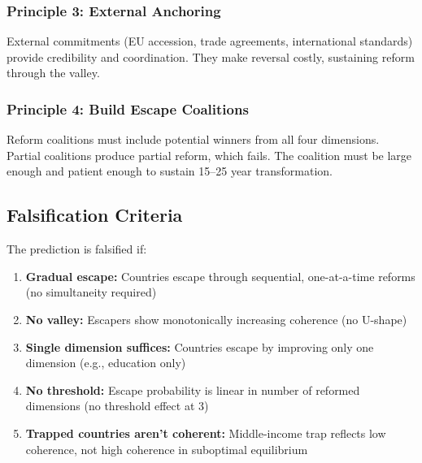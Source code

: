 \subsubsection{Principle 3: External Anchoring}

\begin{tcolorbox}[colback=yellow!5!white, colframe=yellow!75!black]
External commitments (EU accession, trade agreements, international standards) 
provide credibility and coordination. They make reversal costly, sustaining 
reform through the valley.
\end{tcolorbox}

\subsubsection{Principle 4: Build Escape Coalitions}

\begin{tcolorbox}[colback=yellow!5!white, colframe=yellow!75!black]
Reform coalitions must include potential winners from all four dimensions. 
Partial coalitions produce partial reform, which fails. The coalition must 
be large enough and patient enough to sustain 15--25 year transformation.
\end{tcolorbox}

\subsection{Falsification Criteria}

The prediction is falsified if:

\begin{enumerate}
    \item \textbf{Gradual escape:} Countries escape through sequential, 
    one-at-a-time reforms (no simultaneity required)
    
    \item \textbf{No valley:} Escapers show monotonically increasing coherence 
    (no U-shape)
    
    \item \textbf{Single dimension suffices:} Countries escape by improving 
    only one dimension (e.g., education only)
    
    \item \textbf{No threshold:} Escape probability is linear in number of 
    reformed dimensions (no threshold effect at 3)
    
    \item \textbf{Trapped countries aren't coherent:} Middle-income trap 
    reflects low coherence, not high coherence in suboptimal equilibrium
\end{enumerate}

